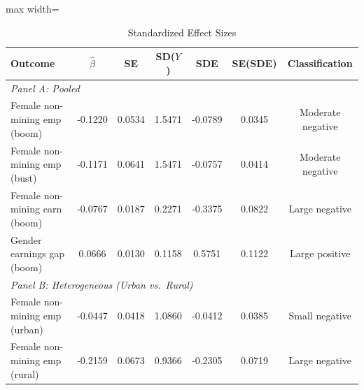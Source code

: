 \begin{table}[htbp]
\centering
\caption{Standardized Effect Sizes}
\label{tab:sde}
\begin{minipage}{\textwidth}
\centering
\begin{adjustbox}{max width=\textwidth}
\begin{tabular}{lcccccc}
\toprule
Outcome & $\hat{\beta}$ & SE & SD($Y$) & SDE & SE(SDE) & Classification \\
\midrule
\multicolumn{7}{l}{\textit{Panel A: Pooled}} \\
Female non-mining emp (boom) & -0.1220 & 0.0534 & 1.5471 & -0.0789 & 0.0345 & Moderate negative \\
Female non-mining emp (bust) & -0.1171 & 0.0641 & 1.5471 & -0.0757 & 0.0414 & Moderate negative \\
Female non-mining earn (boom) & -0.0767 & 0.0187 & 0.2271 & -0.3375 & 0.0822 & Large negative \\
Gender earnings gap (boom) & 0.0666 & 0.0130 & 0.1158 & 0.5751 & 0.1122 & Large positive \\
\midrule
\multicolumn{7}{l}{\textit{Panel B: Heterogeneous (Urban vs.\ Rural)}} \\
Female non-mining emp (urban) & -0.0447 & 0.0418 & 1.0860 & -0.0412 & 0.0385 & Small negative \\
Female non-mining emp (rural) & -0.2159 & 0.0673 & 0.9366 & -0.2305 & 0.0719 & Large negative \\
\bottomrule
\end{tabular}
\end{adjustbox}


\end{minipage}
\end{table}
